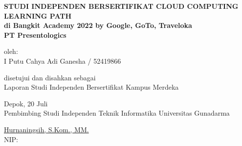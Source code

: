 {
\vspace*{0.5cm}
\begin{center}
    \textbf{STUDI INDEPENDEN BERSERTIFIKAT CLOUD COMPUTING LEARNING PATH} \\
    \textbf{di Bangkit Academy 2022 by Google, GoTo, Traveloka} \\
    \textbf{PT Presentologics} 
    
\end{center}

\vspace*{0.5cm}

\begin{center}
    oleh: \\
    I Putu Cahya Adi Ganesha / 52419866
\end{center}

\vfill

\begin{center}
    disetujui dan disahkan sebagai \\
    Laporan Studi Independen Bersertifikat Kampus Merdeka \\
\end{center}

\vspace{2mm}

\vspace*{0.2cm}

\vspace{5mm}

\vfill
\noindent Depok, 20 Juli \\
\noindent Pembimbing Studi Independen Teknik Informatika Universitas Gunadarma \\

\vspace{2.3cm}

\noindent \underline{Hurnaningsih, S.Kom., MM.} \\
\noindent NIP:

\vspace{10mm}


\vspace*{0.5cm}
}



